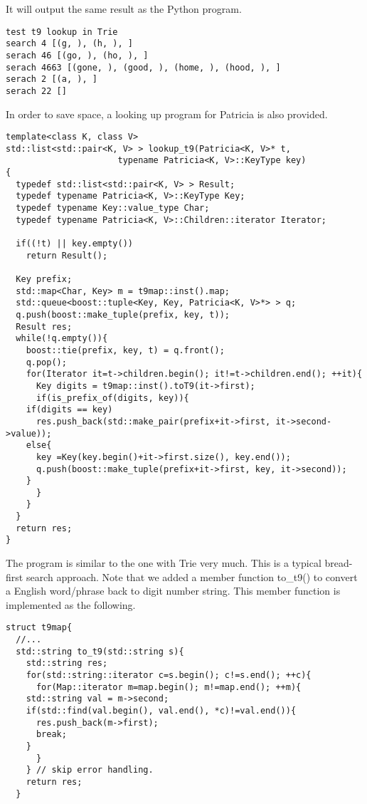 \documentclass{article}
\begin{document}
It will output the same result as the Python program.

\begin{verbatim}
test t9 lookup in Trie
search 4 [(g, ), (h, ), ]
serach 46 [(go, ), (ho, ), ]
serach 4663 [(gone, ), (good, ), (home, ), (hood, ), ]
serach 2 [(a, ), ]
serach 22 []
\end{verbatim}

In order to save space, a looking up program for Patricia is also
provided.

\begin{lstlisting}
template<class K, class V>
std::list<std::pair<K, V> > lookup_t9(Patricia<K, V>* t,
				      typename Patricia<K, V>::KeyType key)
{
  typedef std::list<std::pair<K, V> > Result;
  typedef typename Patricia<K, V>::KeyType Key;
  typedef typename Key::value_type Char;
  typedef typename Patricia<K, V>::Children::iterator Iterator;

  if((!t) || key.empty())
    return Result();

  Key prefix;
  std::map<Char, Key> m = t9map::inst().map;
  std::queue<boost::tuple<Key, Key, Patricia<K, V>*> > q;
  q.push(boost::make_tuple(prefix, key, t));
  Result res;
  while(!q.empty()){
    boost::tie(prefix, key, t) = q.front();
    q.pop();
    for(Iterator it=t->children.begin(); it!=t->children.end(); ++it){
      Key digits = t9map::inst().toT9(it->first);
      if(is_prefix_of(digits, key)){
	if(digits == key)
	  res.push_back(std::make_pair(prefix+it->first, it->second->value));
	else{
	  key =Key(key.begin()+it->first.size(), key.end());
	  q.push(boost::make_tuple(prefix+it->first, key, it->second));
	}
      }
    }
  }
  return res;
}
\end{lstlisting}

The program is similar to the one with Trie very much. This is a
typical bread-first search approach. Note that we added a member
function to\_t9() to convert a English word/phrase back to digit
number string. This member function is implemented as the following.

\begin{lstlisting}
struct t9map{
  //...
  std::string to_t9(std::string s){
    std::string res;
    for(std::string::iterator c=s.begin(); c!=s.end(); ++c){
      for(Map::iterator m=map.begin(); m!=map.end(); ++m){
	std::string val = m->second;
	if(std::find(val.begin(), val.end(), *c)!=val.end()){
	  res.push_back(m->first);
	  break;
	}
      }
    } // skip error handling.
    return res;
  }
\end{lstlisting}
\end{document}
